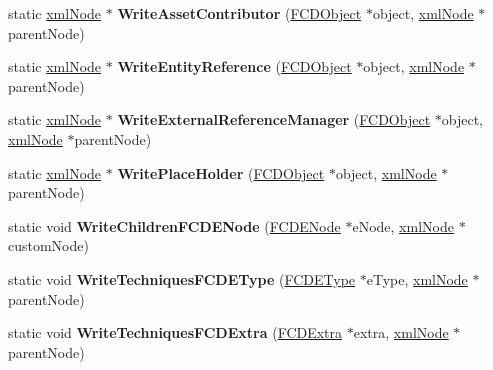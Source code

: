 \begin{DoxyCompactItemize}
\item 
\hypertarget{classFArchiveXML_a61bc3951cbfde500ae7d40a52c1d3d02}{
static \hyperlink{struct__xmlNode}{xmlNode} $\ast$ {\bfseries WriteAssetContributor} (\hyperlink{classFCDObject}{FCDObject} $\ast$object, \hyperlink{struct__xmlNode}{xmlNode} $\ast$parentNode)}
\label{classFArchiveXML_a61bc3951cbfde500ae7d40a52c1d3d02}

\item 
\hypertarget{classFArchiveXML_a9a408594db2809e2d7631cbc417f91bd}{
static \hyperlink{struct__xmlNode}{xmlNode} $\ast$ {\bfseries WriteEntityReference} (\hyperlink{classFCDObject}{FCDObject} $\ast$object, \hyperlink{struct__xmlNode}{xmlNode} $\ast$parentNode)}
\label{classFArchiveXML_a9a408594db2809e2d7631cbc417f91bd}

\item 
\hypertarget{classFArchiveXML_a70b9fb9c35eb9631e441c8669c57f752}{
static \hyperlink{struct__xmlNode}{xmlNode} $\ast$ {\bfseries WriteExternalReferenceManager} (\hyperlink{classFCDObject}{FCDObject} $\ast$object, \hyperlink{struct__xmlNode}{xmlNode} $\ast$parentNode)}
\label{classFArchiveXML_a70b9fb9c35eb9631e441c8669c57f752}

\item 
\hypertarget{classFArchiveXML_a6d3e5c3d99ba03c269e3e15fbb38402a}{
static \hyperlink{struct__xmlNode}{xmlNode} $\ast$ {\bfseries WritePlaceHolder} (\hyperlink{classFCDObject}{FCDObject} $\ast$object, \hyperlink{struct__xmlNode}{xmlNode} $\ast$parentNode)}
\label{classFArchiveXML_a6d3e5c3d99ba03c269e3e15fbb38402a}

\item 
\hypertarget{classFArchiveXML_a018809fda406851712e0231eb8930861}{
static void {\bfseries WriteChildrenFCDENode} (\hyperlink{classFCDENode}{FCDENode} $\ast$eNode, \hyperlink{struct__xmlNode}{xmlNode} $\ast$customNode)}
\label{classFArchiveXML_a018809fda406851712e0231eb8930861}

\item 
\hypertarget{classFArchiveXML_a1b99653a7a756124d2879cfd68521943}{
static void {\bfseries WriteTechniquesFCDEType} (\hyperlink{classFCDEType}{FCDEType} $\ast$eType, \hyperlink{struct__xmlNode}{xmlNode} $\ast$parentNode)}
\label{classFArchiveXML_a1b99653a7a756124d2879cfd68521943}

\item 
\hypertarget{classFArchiveXML_afac50dcd3e52cce8b94a810ea3f50234}{
static void {\bfseries WriteTechniquesFCDExtra} (\hyperlink{classFCDExtra}{FCDExtra} $\ast$extra, \hyperlink{struct__xmlNode}{xmlNode} $\ast$parentNode)}
\label{classFArchiveXML_afac50dcd3e52cce8b94a810ea3f50234}


\end{DoxyCompactItemize}
